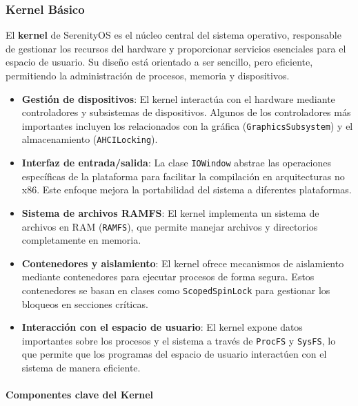 \subsubsection{Kernel Básico}

El \textbf{kernel} de SerenityOS es el núcleo central del sistema operativo, responsable de gestionar los recursos del hardware y proporcionar servicios esenciales para el espacio de usuario. Su diseño está orientado a ser sencillo, pero eficiente, permitiendo la administración de procesos, memoria y dispositivos.

\begin{itemize}
  \item \textbf{Gestión de dispositivos}: El kernel interactúa con el hardware mediante controladores y subsistemas de dispositivos. Algunos de los controladores más importantes incluyen los relacionados con la gráfica (\texttt{GraphicsSubsystem}) y el almacenamiento (\texttt{AHCILocking}).
  \item \textbf{Interfaz de entrada/salida}: La clase \texttt{IOWindow} abstrae las operaciones específicas de la plataforma para facilitar la compilación en arquitecturas no x86. Este enfoque mejora la portabilidad del sistema a diferentes plataformas.
  \item \textbf{Sistema de archivos RAMFS}: El kernel implementa un sistema de archivos en RAM (\texttt{RAMFS}), que permite manejar archivos y directorios completamente en memoria.
  \item \textbf{Contenedores y aislamiento}: El kernel ofrece mecanismos de aislamiento mediante contenedores para ejecutar procesos de forma segura. Estos contenedores se basan en clases como \texttt{ScopedSpinLock} para gestionar los bloqueos en secciones críticas.
  \item \textbf{Interacción con el espacio de usuario}: El kernel expone datos importantes sobre los procesos y el sistema a través de \texttt{ProcFS} y \texttt{SysFS}, lo que permite que los programas del espacio de usuario interactúen con el sistema de manera eficiente.
\end{itemize}

\paragraph{Componentes clave del Kernel}

